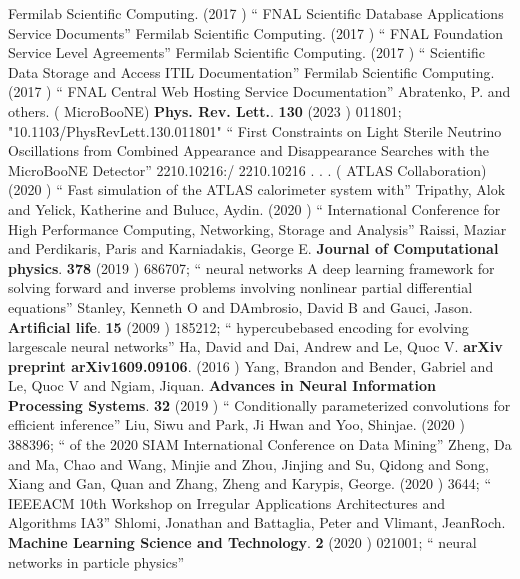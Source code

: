 \documentclass{article}
\begin{document}
\begin{thebibliography}{99}
   Fermilab Scientific Computing. (2017 ) ``  FNAL Scientific Database Applications Service Documents''
   Fermilab Scientific Computing. (2017 ) ``  FNAL Foundation Service Level Agreements''
   Fermilab Scientific Computing. (2017 ) ``  Scientific Data Storage and Access ITIL Documentation''
   Fermilab Scientific Computing. (2017 ) ``  FNAL Central Web Hosting Service Documentation''
  Abratenko, P. and others. ( MicroBooNE) {\bf  Phys. Rev. Lett.}. {\bf  130} (2023 )  011801;  "10.1103/PhysRevLett.130.011801" `` First Constraints on Light Sterile Neutrino Oscillations from Combined Appearance and Disappearance Searches with the MicroBooNE Detector'' 2210.10216:/ 2210.10216
 . 
 . 
 . ( ATLAS Collaboration) (2020 ) `` Fast simulation of the ATLAS calorimeter system with''
  Tripathy, Alok and Yelick, Katherine and Bulucc, Aydin. (2020 ) `` International Conference for High Performance Computing, Networking, Storage and Analysis''
 Raissi, Maziar and Perdikaris, Paris and Karniadakis, George E. {\bf Journal of Computational physics}. {\bf 378} (2019 ) 686707; `` neural networks A deep learning framework for solving forward and inverse problems involving nonlinear partial differential equations''
 Stanley, Kenneth O and DAmbrosio, David B and Gauci, Jason. {\bf Artificial life}. {\bf 15} (2009 ) 185212; `` hypercubebased encoding for evolving largescale neural networks''
 Ha, David and Dai, Andrew and Le, Quoc V. {\bf arXiv preprint arXiv1609.09106}. (2016 ) 
 Yang, Brandon and Bender, Gabriel and Le, Quoc V and Ngiam, Jiquan. {\bf Advances in Neural Information Processing Systems}. {\bf 32} (2019 ) `` Conditionally parameterized convolutions for efficient inference''
 Liu, Siwu and Park, Ji Hwan and Yoo, Shinjae. (2020 ) 388396; `` of the 2020 SIAM International Conference on Data Mining''
 Zheng, Da and Ma, Chao and Wang, Minjie and Zhou, Jinjing and Su, Qidong and Song, Xiang and Gan, Quan and Zhang, Zheng and Karypis, George. (2020 ) 3644; `` IEEEACM 10th Workshop on Irregular Applications Architectures and Algorithms IA3''
 Shlomi, Jonathan and Battaglia, Peter and Vlimant, JeanRoch. {\bf Machine Learning Science and Technology}. {\bf 2} (2020 ) 021001; `` neural networks in particle physics''

\end{thebibliography}
\end{document}
